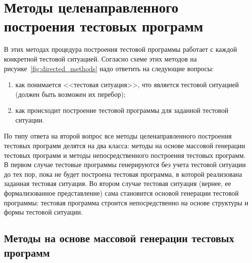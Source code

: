 \section{Методы целенаправленного построения тестовых программ}


В этих методах процедура построения тестовой программы работает с каждой конкретной тестовой ситуацией. Согласно схеме этих методов на рисунке~\ref{fig:directed_methods} надо ответить на следующие вопросы:
\begin{enumerate}
  \item как понимается <<тестовая ситуация>>, что является тестовой ситуацией (должен быть возможен их перебор);
  \item как происходит построение тестовой программы для заданной тестовой ситуации.
\end{enumerate}

По типу ответа на второй вопрос все методы целенаправленного построения тестовых программ делятся на два класса: методы на основе массовой генерации тестовых программ и методы непосредственного построения тестовых программ. В первом случае тестовые программы генерируются без учета тестовой ситуации до тех пор, пока не будет построена тестовая программа, в которой реализована заданная тестовая ситуация. Во втором случае тестовая ситуация (вернее, ее формализованное представление) сама становится основой генерации тестовой программы: тестовая программа строится непосредственно на основе структуры и формы тестовой ситуации.

\subsection{Методы на основе массовой генерации тестовых программ}

